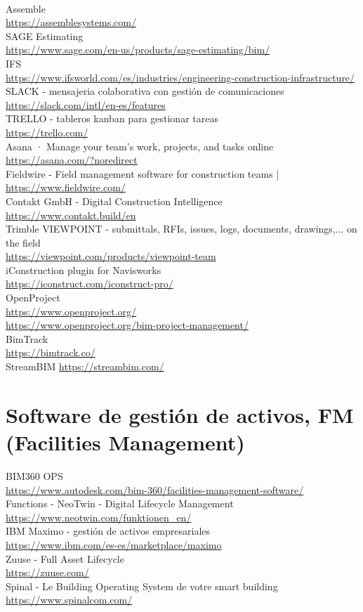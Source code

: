 \documentclass[spanish,12pt,a4paper,final,oneside]{book}
\begin{document}
\\ Assemble \\ \url{https://assemblesystems.com/}
\\ SAGE Estimating \\ \url{https://www.sage.com/en-us/products/sage-estimating/bim/}
\\ IFS \\ \url{https://www.ifsworld.com/es/industries/engineering-construction-infrastructure/}
\\ SLACK - mensajeria colaborativa con gestión de comunicaciones \\ \url{https://slack.com/intl/en-es/features}
\\ TRELLO - tableros kanban para gestionar tareas \\ \url{https://trello.com/}
\\ Asana · Manage your team’s work, projects, and tasks online \\ \url{https://asana.com/?noredirect}
\\ Fieldwire - Field management software for construction teams |  \\ \url{https://www.fieldwire.com/}
\\ Contakt GmbH - Digital Construction Intelligence \\ \url{https://www.contakt.build/en}
\\ Trimble VIEWPOINT - submittals, RFIs, issues, logs, documents, drawings,... on the field \\ \url{https://viewpoint.com/products/viewpoint-team}
\\iConstruction plugin for Navisworks \\ \url{https://iconstruct.com/iconstruct-pro/}
\\OpenProject \\ \url{https://www.openproject.org/} \\ \url{https://www.openproject.org/bim-project-management/}
\\BimTrack \\ \url{https://bimtrack.co/}
\\StreamBIM \url{https://streambim.com/}

\section{Software de gestión de activos, FM (Facilities Management)}
BIM360 OPS \\ \url{https://www.autodesk.com/bim-360/facilities-management-software/}
\\ Functions - NeoTwin - Digital Lifecycle Management \\ \url{https://www.neotwin.com/funktionen_en/}
\\ IBM Maximo - gestión de activos empresariales \\ \url{https://www.ibm.com/es-es/marketplace/maximo}
\\ Zuuse - Full Asset Lifecycle \\ \url{https://zuuse.com/}
\\ Spinal - Le Building Operating System de votre smart building \\ \url{https://www.spinalcom.com/}
\end{document}
